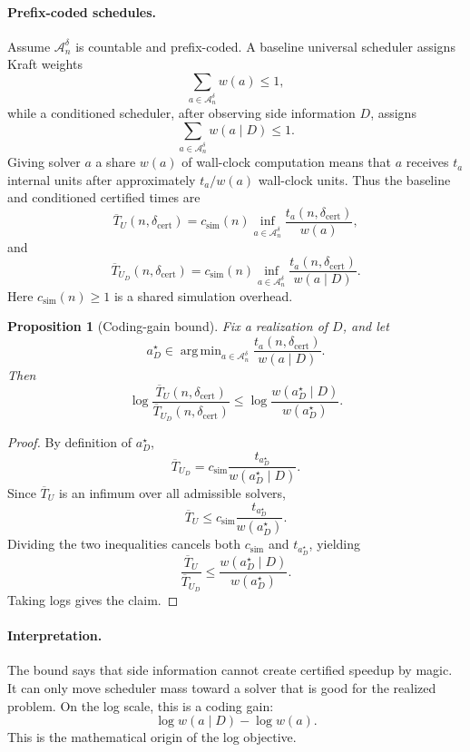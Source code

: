\documentclass{article}
\newtheorem{proposition}{Proposition}
\DeclareMathOperator*{\argmin}{arg\,min}
\newcommand{\cA}{\mathcal{A}}
\begin{document}
\paragraph{Prefix-coded schedules.}
Assume \(\cA_n^\delta\) is countable and prefix-coded.
A baseline universal scheduler assigns Kraft weights
\[
    \sum_{a\in\cA_n^\delta} w(a)\le 1,
\]
while a conditioned scheduler, after observing side information \(D\), assigns
\[
    \sum_{a\in\cA_n^\delta} w(a\mid D)\le 1.
\]
Giving solver \(a\) a share \(w(a)\) of wall-clock computation means that \(a\) receives
\(t_a\) internal units after approximately \(t_a/w(a)\) wall-clock units.  Thus the baseline
and conditioned certified times are
\[
    \overline T_U(n,\delta_{\mathrm{cert}})
    =
    c_{\mathrm{sim}}(n)
    \inf_{a\in\cA_n^\delta}
    \frac{t_a(n,\delta_{\mathrm{cert}})}{w(a)},
\]
and
\[
    \overline T_{U_D}(n,\delta_{\mathrm{cert}})
    =
    c_{\mathrm{sim}}(n)
    \inf_{a\in\cA_n^\delta}
    \frac{t_a(n,\delta_{\mathrm{cert}})}{w(a\mid D)}.
\]
Here \(c_{\mathrm{sim}}(n)\ge 1\) is a shared simulation overhead.

\begin{proposition}[Coding-gain bound]
\label{prop:app-coding-gain}
Fix a realization of \(D\), and let
\[
    a_D^\star
    \in
    \argmin_{a\in\cA_n^\delta}
    \frac{t_a(n,\delta_{\mathrm{cert}})}{w(a\mid D)}.
\]
Then
\[
    \log\frac{\overline T_U(n,\delta_{\mathrm{cert}})}
             {\overline T_{U_D}(n,\delta_{\mathrm{cert}})}
    \le
    \log\frac{w(a_D^\star\mid D)}{w(a_D^\star)}.
\]
\end{proposition}

\begin{proof}
By definition of \(a_D^\star\),
\[
    \overline T_{U_D}
    =
    c_{\mathrm{sim}}
    \frac{t_{a_D^\star}}{w(a_D^\star\mid D)}.
\]
Since \(\overline T_U\) is an infimum over all admissible solvers,
\[
    \overline T_U
    \le
    c_{\mathrm{sim}}
    \frac{t_{a_D^\star}}{w(a_D^\star)}.
\]
Dividing the two inequalities cancels both \(c_{\mathrm{sim}}\) and \(t_{a_D^\star}\), yielding
\[
    \frac{\overline T_U}{\overline T_{U_D}}
    \le
    \frac{w(a_D^\star\mid D)}{w(a_D^\star)}.
\]
Taking logs gives the claim.
\end{proof}

\paragraph{Interpretation.}
The bound says that side information cannot create certified speedup by magic.
It can only move scheduler mass toward a solver that is good for the realized problem.
On the log scale, this is a coding gain:
\[
    \log w(a\mid D)-\log w(a).
\]
This is the mathematical origin of the log objective.
\end{document}
